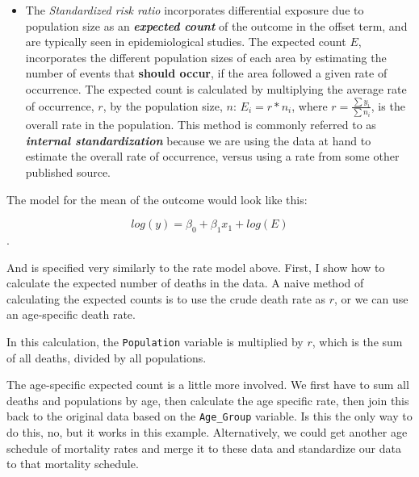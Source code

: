 \documentclass[
]{article}
\newenvironment{Shaded}{\begin{snugshade}}{\end{snugshade}}
\newcommand{\CommentTok}[1]{\textcolor[rgb]{0.56,0.35,0.01}{\textit{#1}}}
\newcommand{\FunctionTok}[1]{\textcolor[rgb]{0.00,0.00,0.00}{#1}}
\newcommand{\NormalTok}[1]{#1}
\newcommand{\OtherTok}[1]{\textcolor[rgb]{0.56,0.35,0.01}{#1}}
\newcommand{\SpecialCharTok}[1]{\textcolor[rgb]{0.00,0.00,0.00}{#1}}
\providecommand{\tightlist}{%
  \setlength{\itemsep}{0pt}\setlength{\parskip}{0pt}}
\begin{document}
\begin{itemize}
\tightlist
\item
  The \emph{Standardized risk ratio} incorporates differential exposure due to population size as an \textbf{\emph{expected count}} of the outcome in the offset term, and are typically seen in epidemiological studies. The expected count \(E\), incorporates the different population sizes of each area by estimating the number of events that \textbf{should occur}, if the area followed a given rate of occurrence. The expected count is calculated by multiplying the average rate of occurrence, \(r\), by the population size, \(n\): \(E_i = r * n_i\), where \(r = \frac{\sum y_i}{\sum n_i}\), is the overall rate in the population. This method is commonly referred to as \textbf{\emph{internal standardization}} because we are using the data at hand to estimate the overall rate of occurrence, versus using a rate from some other published source.
\end{itemize}

The model for the mean of the outcome would look like this:

\[log(y)= \beta_0 + \beta_1 x_1  + log(E)\].

And is specified very similarly to the rate model above. First, I show how to calculate the expected number of deaths in the data. A naive method of calculating the expected counts is to use the crude death rate as \(r\), or we can use an age-specific death rate.

\begin{Shaded}
\end{Shaded}

In this calculation, the \texttt{Population} variable is multiplied by \(r\), which is the sum of all deaths, divided by all populations.

The age-specific expected count is a little more involved. We first have to sum all deaths and populations by age, then calculate the age specific rate, then join this back to the original data based on the \texttt{Age\_Group} variable. Is this the only way to do this, no, but it works in this example. Alternatively, we could get another age schedule of mortality rates and merge it to these data and standardize our data to that mortality schedule.
\end{document}
